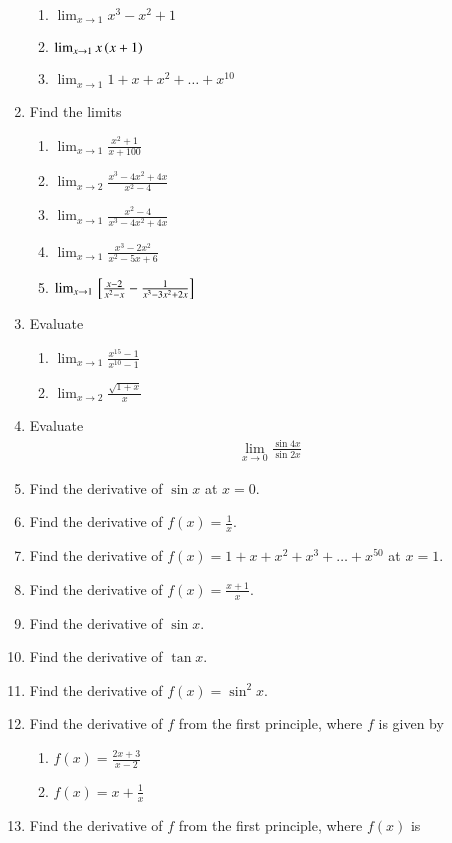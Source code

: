 \begin{enumerate}[label=\arabic*.,ref=\thesubsection.\theenumi]
\begin{enumerate}
\item  $\lim_{x\to 1}x^3-x^2+1$
\item  $\lim_{x\to 1}x\left(x+1\right)$
\item $\lim_{x\to 1}1 +x + x^2 + \dots + x^10$
\end{enumerate}
%
\item Find the limits 
\begin{enumerate}
\item  $\lim_{x\to 1}\frac{x^2+1}{x+100}$
\item  $\lim_{x\to 2}\frac{x^3-4x^2+4x}{x^2-4}$
\item  $\lim_{x\to 1}\frac{x^2-4}{x^3-4x^2+4x}$
\item  $\lim_{x\to 1}\frac{x^3-2x^2}{x^2-5x+6}$
\item  $\lim_{x\to 1}{}\left[\frac{x-2}{x^2-x} - \frac{1}{x^3-3x^2+2x}\right]$
\end{enumerate}
%
\item Evaluate 
%
\begin{enumerate}
\item  $\lim_{x\to 1}\frac{x^15-1}{x^10-1}$
\item  $\lim_{x\to 2}\frac{\sqrt{1+x}}{x}$
\end{enumerate}
%
\item Evaluate 
%
\begin{align}
\lim_{x\to 0}\frac{\sin 4x}{\sin 2x}
\end{align}
%
\item Find the derivative of $\sin x $ at $x = 0$.
\item Find the derivative of $f(x) = \frac{1}{x}$.
\item Find the derivative of $f(x) = 1 + x + x^2 + x^3 + \dots + x^50$ at $x = 1$.
\item Find the derivative of $f(x) = \frac{x+1}{x}$.
\item Find the derivative of $\sin x $.
\item Find the derivative of $\tan x $.
\item Find the derivative of $f(x) = \sin^2 x $.
%
\item Find the derivative of $f$ from the first principle, where $f$ is given by 
%
\begin{enumerate}
\item  $f(x) = \frac{2x+3}{x-2}$
\item  $f(x) = x + \frac{1}{x}$
\end{enumerate}
%
\item Find the derivative of $f$ from the first principle, where $f(x)$ is 

\end{enumerate}
